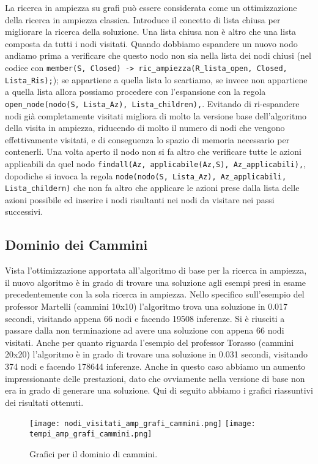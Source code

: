 La ricerca in ampiezza su grafi può essere considerata come un ottimizzazione della ricerca in ampiezza classica. Introduce il concetto di lista chiusa per migliorare la ricerca della soluzione. Una lista chiusa non è altro che una lista composta da tutti i nodi visitati. Quando
dobbiamo espandere un nuovo nodo andiamo prima a verificare che questo nodo non sia nella lista dei nodi chiusi (nel codice con \lstinline{member(S, Closed) -> ric_ampiezza(R_lista_open, Closed, Lista_Ris);}); se appartiene a quella lista lo scartiamo, se invece non appartiene a quella lista allora possiamo procedere con l'espansione con la regola  \lstinline{open_node(nodo(S, Lista_Az), Lista_children),}.
Evitando di ri-espandere nodi già completamente visitati migliora di molto la versione base dell'algoritmo della visita in ampiezza, riducendo di molto il numero di nodi che vengono effettivamente visitati, e di conseguenza lo spazio di memoria necessario per contenerli. Una volta aperto il nodo non si fa altro che verificare tutte le azioni applicabili da quel nodo \lstinline{findall(Az, applicabile(Az,S), Az_applicabili),}, dopodiche si invoca la regola \lstinline{node(nodo(S, Lista_Az), Az_applicabili, Lista_childern)} che non fa altro che applicare le azioni prese dalla lista delle azioni possibile ed inserire i nodi risultanti nei nodi da visitare nei passi successivi.

\subsection{Dominio dei Cammini}
Vista l'ottimizzazione apportata all'algoritmo di base per la ricerca in ampiezza, il nuovo algoritmo è in grado di trovare una soluzione agli esempi presi in esame precedentemente con la sola ricerca in ampiezza. Nello specifico sull'esempio del professor Martelli (cammini 10x10) l'algoritmo trova una soluzione in 0.017 secondi, visitando appena 66 nodi e facendo 19508 inferenze. Si è riusciti a passare dalla non terminazione ad avere una soluzione con appena 66 nodi visitati. Anche per quanto riguarda l'esempio del professor Torasso (cammini 20x20) l'algoritmo è in grado di trovare una soluzione in 0.031 secondi, visitando 374 nodi e facendo 178644 inferenze. Anche in questo caso abbiamo un aumento impressionante delle prestazioni, dato che ovviamente nella versione di base non era in grado di generare una soluzione.
Qui di seguito abbiamo i grafici riassuntivi dei risultati ottenuti.
\begin{landscape}
\begin{sidewaysfigure}
\centering
{\texttt{[image: nodi\_visitati\_amp\_grafi\_cammini.png]}}\qquad\qquad
{\texttt{[image: tempi\_amp\_grafi\_cammini.png]}}\qquad\qquad
\caption{Grafici per il dominio di cammini.}
\end{sidewaysfigure}
\end{landscape}




